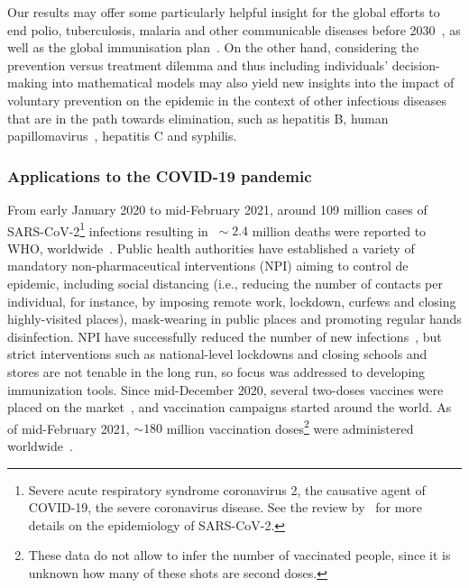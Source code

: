 Our results may offer some particularly helpful insight for the global efforts to end polio, tuberculosis, malaria and other communicable diseases before 2030~\cite[]{SDG_Goal3}, as well as the global immunisation plan~\cite[]{WHO_GVAP2018}. On the other hand, considering the prevention versus treatment dilemma and thus including individuals' decision-making into mathematical models may also yield new insights into the impact of voluntary prevention on the epidemic in the context of other infectious diseases that are in the path towards elimination, such as hepatitis B, human papillomavirus~\cite[]{Basu2008}, hepatitis C and syphilis.

\subsubsection*{Applications to the COVID-19 pandemic}

\noindent From early January 2020 to mid-February 2021, around 109 million cases of SARS-CoV-2\footnote{Severe acute respiratory syndrome coronavirus 2, the causative agent of COVID-19, the severe coronavirus disease. See the review by~\cite{Salzberger2020} for more details on the epidemiology of SARS-CoV-2.} infections resulting in $~\sim2.4$ million deaths were reported to WHO, worldwide~\cite[]{WHO_CovidDashboard}. Public health authorities have established a variety of mandatory non-pharmaceutical interventions (NPI) aiming to control de epidemic, including social distancing (i.e., reducing the number of contacts per individual, for instance, by imposing remote work, lockdown, curfews and closing highly-visited places), mask-wearing in public places and promoting regular hands disinfection. NPI have successfully reduced the number of new infections~\cite[]{Bo2021}, but strict interventions such as national-level lockdowns and closing schools and stores are not tenable in the long run, so focus was addressed to developing immunization tools. Since mid-December 2020, several two-doses vaccines %
were placed on the market~\cite[]{WHO_CovidVaccines}, and vaccination campaigns started around the world. As of mid-February 2021, $\sim180$ million vaccination doses\footnote{These data do not allow to infer the number of vaccinated people, since it is unknown how many of these shots are second doses.} were administered worldwide~\cite[]{OWID_CovidVaccination}.

